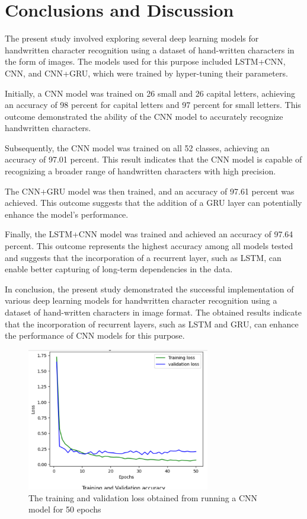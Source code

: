 \chapter{Conclusions and Discussion}\label{final}
 The present study involved exploring several deep learning models for handwritten character recognition using a dataset of hand-written characters in the form of images. The models used for this purpose included LSTM+CNN, CNN, and CNN+GRU, which were trained by hyper-tuning their parameters.
 
 Initially, a CNN model was trained on 26 small and 26 capital letters, achieving an accuracy of 98 percent for capital letters and 97 percent for small letters. This outcome demonstrated the ability of the CNN model to accurately recognize handwritten characters.

Subsequently, the CNN model was trained on all 52 classes, achieving an accuracy of 97.01 percent. This result indicates that the CNN model is capable of recognizing a broader range of handwritten characters with high precision.

The CNN+GRU model was then trained, and an accuracy of 97.61 percent was achieved. This outcome suggests that the addition of a GRU layer can potentially enhance the model's performance.

Finally, the LSTM+CNN model was trained and achieved an accuracy of 97.64 percent. This outcome represents the highest accuracy among all models tested and suggests that the incorporation of a recurrent layer, such as LSTM, can enable better capturing of long-term dependencies in the data.

In conclusion, the present study demonstrated the successful implementation of various deep learning models for handwritten character recognition using a dataset of hand-written characters in image format. The obtained results indicate that the incorporation of recurrent layers, such as LSTM and GRU, can enhance the performance of CNN models for this purpose.

\begin{figure}[htp]
    \centering
    \includegraphics[width=8cm]{report/image1.png}
    \caption{The training and validation loss obtained from running a CNN model for 50 epochs}
    \label{fig:galaxy}
\end{figure}

